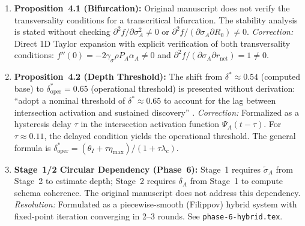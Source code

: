 \begin{enumerate}
\item \textbf{Proposition~4.1 (Bifurcation):}
  Original manuscript does not verify the transversality conditions
  for a transcritical bifurcation. The stability analysis is stated
  without checking $\partial^2 f / \partial \sigma_A^2 \neq 0$ or
  $\partial^2 f / (\partial \sigma_A \partial R_0) \neq 0$.
  \textit{Correction:} Direct 1D Taylor expansion with explicit
  verification of both transversality conditions:
  $f''(0) = -2\gamma_\sigma \rho P_A \alpha_A \neq 0$ and
  $\partial^2 f / (\partial \sigma_A \partial r_{\text{net}}) = 1 \neq 0$.

\item \textbf{Proposition~4.2 (Depth Threshold):}
  The shift from $\delta^* \approx 0.54$ (computed base) to
  $\delta^*_{\text{oper}} = 0.65$ (operational threshold) is presented
  without derivation: ``adopt a nominal threshold of $\delta^* \approx 0.65$
  to account for the lag between intersection activation and sustained
  discovery'' \citep{redhardt2025}.
  \textit{Correction:} Formalized as a hysteresis delay $\tau$ in
  the intersection activation function $\Psi_A(t - \tau)$. For
  $\tau \approx 0.11$, the delayed condition yields the operational
  threshold. The general formula is
  $\delta_{\text{oper}}^* = (\theta_I + \tau \eta_{\max}) / (1 + \tau \lambda_c)$.

\item \textbf{Stage~1/2 Circular Dependency (Phase~6):}
  Stage~1 requires $\tilde{\sigma}_A$ from Stage~2 to estimate depth;
  Stage~2 requires $\delta_A$ from Stage~1 to compute schema coherence.
  The original manuscript does not address this dependency.
  \textit{Resolution:} Formulated as a piecewise-smooth (Filippov)
  hybrid system with fixed-point iteration converging in 2--3 rounds.
  See \texttt{phase-6-hybrid.tex}.

\end{enumerate}
